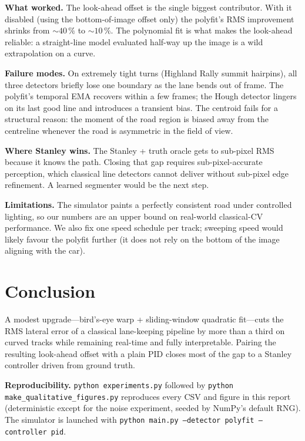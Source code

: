 \documentclass[10pt,a4paper,twocolumn]{article}
\begin{document}
\textbf{What worked.} The look-ahead offset is the single biggest
contributor. With it disabled (using the bottom-of-image offset only)
the polyfit's RMS improvement shrinks from $\sim40\,\%$ to
$\sim10\,\%$. The polynomial fit is what makes the look-ahead reliable:
a straight-line model evaluated half-way up the image is a wild
extrapolation on a curve.

\textbf{Failure modes.} On extremely tight turns (Highland Rally
summit hairpins), all three detectors briefly lose one boundary as the
lane bends out of frame. The polyfit's temporal EMA recovers within a
few frames; the Hough detector lingers on its last good line and
introduces a transient bias. The centroid fails for a structural
reason: the moment of the road region is biased away from the
centreline whenever the road is asymmetric in the field of view.

\textbf{Where Stanley wins.} The Stanley + truth oracle gets to
sub-pixel RMS because it knows the path. Closing that gap requires
sub-pixel-accurate perception, which classical line detectors cannot
deliver without sub-pixel edge refinement. A learned segmenter would
be the next step.

\textbf{Limitations.} The simulator paints a perfectly consistent road
under controlled lighting, so our numbers are an upper bound on
real-world classical-CV performance. We also fix one speed schedule
per track; sweeping speed would likely favour the polyfit further (it
does not rely on the bottom of the image aligning with the car).

\section{Conclusion}
A modest upgrade---bird's-eye warp + sliding-window quadratic
fit---cuts the RMS lateral error of a classical lane-keeping pipeline
by more than a third on curved tracks while remaining real-time and
fully interpretable. Pairing the resulting look-ahead offset with a
plain PID closes most of the gap to a Stanley controller driven from
ground truth.

{\footnotesize\textbf{Reproducibility.} \texttt{python experiments.py}
followed by \texttt{python make\_qualitative\_figures.py} reproduces
every CSV and figure in this report (deterministic except for the noise
experiment, seeded by NumPy's default RNG). The simulator is launched
with \texttt{python main.py --detector polyfit --controller pid}.}
\end{document}
